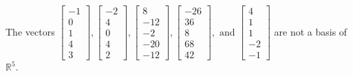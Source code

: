 \begin{exercise}
\begin{exerciseStatement}
  \end{exerciseStatement}
  \begin{exerciseAnswer}
   The vectors \(\left[\begin{array}{r}
-1 \\
0 \\
1 \\
4 \\
3
\end{array}\right] , \left[\begin{array}{r}
-2 \\
4 \\
0 \\
4 \\
2
\end{array}\right] , \left[\begin{array}{r}
8 \\
-12 \\
-2 \\
-20 \\
-12
\end{array}\right] , \left[\begin{array}{r}
-26 \\
36 \\
8 \\
68 \\
42
\end{array}\right] , \text{ and } \left[\begin{array}{r}
4 \\
1 \\
1 \\
-2 \\
-1
\end{array}\right]\) 
  	 are not  a basis of \(\mathbb{R}^5\).
  


  \end{exerciseAnswer}
\end{exercise}